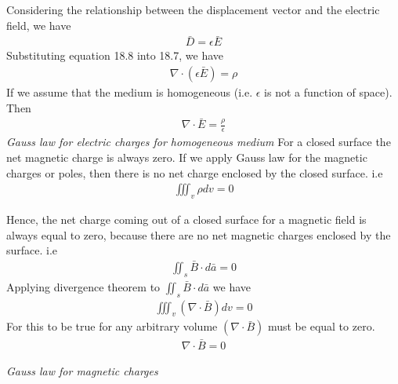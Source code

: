 Considering the relationship between the displacement vector and the electric field, we have 
\begin{align}
\boxed{\bar{D} = \epsilon\bar{E}}
\end{align}
Substituting equation 18.8 into 18.7, we have
\begin{align*}
\nabla \cdot (\epsilon\bar{E}) = \rho
\end{align*}
If we assume that the medium is homogeneous (i.e. $\epsilon$ is not a function of space). Then
\begin{align} 
\boxed{\nabla \cdot \bar{E} = \frac{\rho}{\epsilon}}
\end{align} 
\emph{Gauss law for electric charges for homogeneous medium}
For a closed surface the net magnetic charge is always zero. If we apply Gauss law for the magnetic charges or poles, then there is no net charge enclosed by the closed surface. i.e
\begin{align*}
\iiint_v\rho dv = 0
\end{align*}

Hence, the net charge coming out of a closed surface for a magnetic field is always equal to zero, because there are no net magnetic charges enclosed by the surface. i.e 
\begin{align*}
\iint_s\bar{B}\cdot d\bar{a} = 0
\end{align*}
Applying divergence theorem to $\iint_s\bar{B}\cdot d\bar{a}$ we have
\begin{align*}
\iiint_v(\nabla \cdot \bar{B})dv = 0
\end{align*}	
For this to be true for any arbitrary volume $(\nabla \cdot \bar{B})$ must be equal to zero.
\begin{align}
\boxed{\nabla \cdot \bar{B} = 0}
\end{align}
\begin{center}
\emph{Gauss law for magnetic charges}
\end{center}

